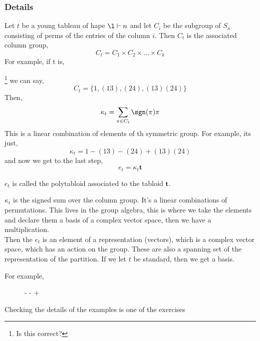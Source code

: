 \documentclass{article}
\begin{document}
\subsubsection{Details}
Let $t$ be a young tableau of hape $\l \vdash n$ and let $C_i$ be the subgroup of $S_n$ consisting of perms of the entries of the column $i$. Then $C_t$ is the associated column group,
$$ C_t = C_1 \times C_2 \times \dots \times C_k $$
For example, if t is,
\begin{figure}[!ht]
  \centering
\end{figure}\footnote{Is this correct?}
we can say,
$$ C_t = \{1, (1 3), (2 4), (1 3)(2 4)\}  $$
Then,
$$ \kappa_t = \sum_{\pi \in C_t}{\sgn (\pi)\pi} $$
\newpage
This is a linear combination of elements of th symmetric group. For example, its just,
$$ \kappa_t = 1 - (1 3) - (2 4) + (1 3)(2 4)  $$
and now we get to the last step,
$$ e_t = \kappa_t \mathbf{t} $$
\begin{remark}
  $e_t$ is called the polytabloid associated to the tabloid $\mathbf{t}$.
\end{remark}

\begin{remark}
   $\kappa_t$ is the signed sum over the column group. It's a linear combinations of permutations. This lives in the group algebra, this is where we take the elements and declare them a basis of a complex vector space, then we have a multiplication. \\
   Then the $e_t$ is an element of a representation (vectors), which is a complex vector space, which has an action on the group. These are also a spanning set of the representation of the partition. If we let $t$ be standard, then we get a basis.
\end{remark}

For example,

\begin{figure}[!ht]
\centering
{}
\hspace{10pt} - \hspace{10pt} \hspace{10pt} - \hspace{10pt}\hspace{10pt} + \hspace{10pt}
\end{figure}

\begin{ex}
  Checking the details of the examples is one of the exercises
\end{ex}
\end{document}
